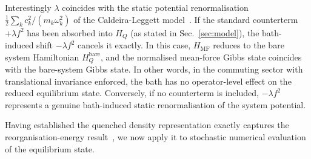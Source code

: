 Interestingly $\lambda$ coincides with the static potential renormalisation
$\frac{1}{2}\sum_k c_k^2/(m_k\omega_k^2)$ of the Caldeira-Leggett model~\cite{correaPotentialRenormalisationLamb2025}. If the standard counterterm $+\lambda f^2$ has been absorbed into $H_Q$ (as stated in Sec.~\ref{sec:model}), the bath-induced shift
$-\lambda f^2$ cancels it exactly. In this case, $H_{\mathrm{MF}}$ reduces to the bare system Hamiltonian $H_Q^{\mathrm{bare}}$, and the normalised mean-force Gibbs state coincides with the bare-system Gibbs state. In other words, in the commuting sector with translational invariance enforced, the bath has no operator-level effect on the reduced equilibrium
state. Conversely, if no counterterm is included, $-\lambda f^2$ represents a genuine
bath-induced static renormalisation of the system potential.

Having established the quenched density representation exactly captures the reorganisation-energy result~\cite{campisiTalknerHanggi2009Solvable}, we now apply it to stochastic numerical evaluation of the equilibrium state.

